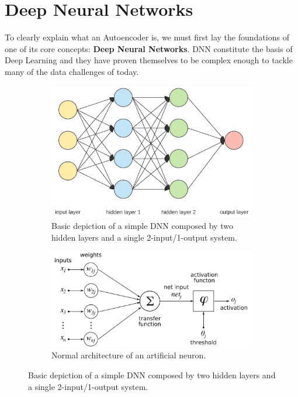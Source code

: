 \section{Deep Neural Networks}

To clearly explain what an Autoencoder is, we must first lay the foundations of one of its core concepts: \textbf{Deep Neural Networks}. DNN constitute the basis of Deep Learning and they have proven themselves to be complex enough to tackle many of the data challenges of today. \par

\begin{figure}[H]
	\begin{subfigure}{0.65\linewidth}  
		\centering
		\includegraphics[width=\linewidth]{Figuras_tfg/Figure2_tfg}
		\caption{Basic depiction of a simple DNN composed by two hidden layers and a single 2-input/1-output system.}
		\label{fig:fig2a} 
	\end{subfigure}
	
	\begin{subfigure}{0.65\linewidth} 
		\centering
		\includegraphics[width=\linewidth]{Figuras_tfg/ArtificialNeuronModel_english.png}
		\caption{Normal architecture of an artificial neuron.}
		\label{fig:fig2b} 
	\end{subfigure}
	\caption{Basic depiction of a simple DNN composed by two hidden layers and a single 2-input/1-output system.}
	\label{fig:fig2}
\end{figure}

